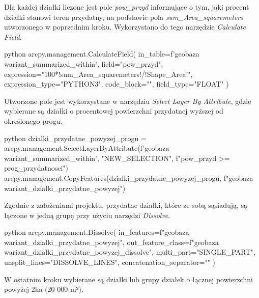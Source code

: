 \documentclass{article}
\begin{document}
Dla każdej działki liczone jest pole \textit{pow\_przyd} informujące o tym, jaki procent działki stanowi teren przydatny, na podstawie pola \textit{sum\_Area\_squaremeters} utworzonego w poprzednim kroku. Wykorzystano do tego narzędzie \textit{Calculate Field}.
\vspace{5pt}

\begin{mintedbox}{python}
arcpy.management.CalculateField(
    in_table=f'{geobaza}\\{wariant}_summarized_within',
    field="pow_przyd",
    expression="100*!sum_Area_squaremeters!/!Shape_Area!",
    expression_type="PYTHON3",
    code_block="",
    field_type="FLOAT"
)
\end{mintedbox}
\vspace{10pt}

Utworzone pole jest wykorzystane w narzędziu \textit{Select Layer By Attribute}, gdzie wybierane są działki o procentowej powierzchni przydatnej wyższej od określonego progu.
\vspace{5pt}

\begin{mintedbox}{python}
dzialki_przydatne_powyzej_progu = arcpy.management.SelectLayerByAttribute(f'{geobaza}\\{wariant}_summarized_within', "NEW_SELECTION", f"pow_przyd >= {prog_przydatnosci}")
arcpy.management.CopyFeatures(dzialki_przydatne_powyzej_progu, f"{geobaza}\\{wariant}_dzialki_przydatne_powyzej")
\end{mintedbox}
\vspace{10pt}

Zgodnie z założeniami projektu, przydatne działki, które ze sobą sąsiadują, są łączone w jedną grupę przy użyciu narzędzi \textit{Dissolve}.
\vspace{5pt}

\begin{mintedbox}{python}
arcpy.management.Dissolve(
in_features=f"{geobaza}\\{wariant}_dzialki_przydatne_powyzej",
out_feature_class=f"{geobaza}\\{wariant}_dzialki_przydatne_powyzej_dissolve",
multi_part="SINGLE_PART",
unsplit_lines="DISSOLVE_LINES",
concatenation_separator=""
)
\end{mintedbox}
\vspace{10pt}

W ostatnim kroku wybierane są działki lub grupy działek o łącznej powierzchni powyżej 2ha (20 000 m²).
\end{document}

